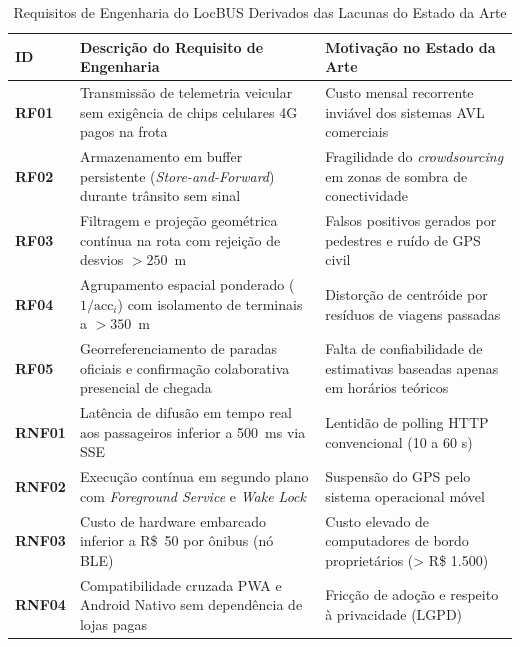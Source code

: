 \documentclass[lettersize,journal]{IEEEtran}
\begin{document}
\begin{table}[h]
\centering
\caption{Requisitos de Engenharia do LocBUS Derivados das Lacunas do Estado da Arte}
\label{tab_requisitos}
\begin{tabular}{lp{4.2cm}l}
\toprule
\textbf{ID} & \textbf{Descrição do Requisito de Engenharia} & \textbf{Motivação no Estado da Arte} \\
\midrule
\textbf{RF01} & Transmissão de telemetria veicular sem exigência de chips celulares 4G pagos na frota & Custo mensal recorrente inviável dos sistemas AVL comerciais \\
\textbf{RF02} & Armazenamento em buffer persistente (\textit{Store-and-Forward}) durante trânsito sem sinal & Fragilidade do \textit{crowdsourcing} em zonas de sombra de conectividade \\
\textbf{RF03} & Filtragem e projeção geométrica contínua na rota com rejeição de desvios $> 250$~m & Falsos positivos gerados por pedestres e ruído de GPS civil \\
\textbf{RF04} & Agrupamento espacial ponderado ($1/\text{acc}_i$) com isolamento de terminais a $> 350$~m & Distorção de centróide por resíduos de viagens passadas \\
\textbf{RF05} & Georreferenciamento de paradas oficiais e confirmação colaborativa presencial de chegada & Falta de confiabilidade de estimativas baseadas apenas em horários teóricos \\
\midrule
\textbf{RNF01} & Latência de difusão em tempo real aos passageiros inferior a 500~ms via SSE & Lentidão de polling HTTP convencional (10 a 60 s) \\
\textbf{RNF02} & Execução contínua em segundo plano com \textit{Foreground Service} e \textit{Wake Lock} & Suspensão do GPS pelo sistema operacional móvel \\
\textbf{RNF03} & Custo de hardware embarcado inferior a R\$~50 por ônibus (nó BLE) & Custo elevado de computadores de bordo proprietários (> R\$ 1.500) \\
\textbf{RNF04} & Compatibilidade cruzada PWA e Android Nativo sem dependência de lojas pagas & Fricção de adoção e respeito à privacidade (LGPD) \\
\bottomrule
\end{tabular}
\end{table}
\end{document}
